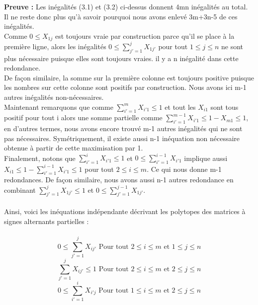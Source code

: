\documentclass{book}
\begin{document}
\textbf{Preuve : }
Les inégalités (3.1) et (3.2) ci-dessus donnent 4mn inégalités au total. \\ Il ne reste donc plus qu'à savoir pourquoi nous avons enlevé 3m+3n-5 de ces inégalités. \\
Comme $0 \leqslant X_{1j}$ est toujours vraie par construction parce qu'il se place à la première ligne, alors les inégalités $0  \leqslant \sum_{j'=1}^{j} X_{1j'}$ pour tout $1 \leqslant j \leqslant n$ ne sont plus nécessaire puisque elles sont toujours vraies. il y a n inégalité dans cette redondance.\\
De façon similaire, la somme sur la première colonne est toujours positive puisque les nombres sur cette colonne sont positifs par construction. Nous avons ici m-1 autres inégalités non-nécessaires. \\
Maintenant remarquons que comme $\sum_{i'=1}^{m} X_{i'1} \leqslant 1 $ et tout les $X_{i1}$ sont tous positif pour tout i alors une somme partielle comme $\sum_{i'=1}^{m-1} X_{i'1} \leqslant 1- X_{m1} \leqslant 1$, en d'autres termes, nous avons encore trouvé m-1 autres inégalités qui ne sont pas nécessaires. Symétriquement, il existe aussi n-1 inéquation non nécessaire obtenue à partir de cette maximisation par 1.\\
Finalement, notons que $\sum_{i'=1}^{i} X_{i'1} \leqslant 1 $ et $ 0 \leqslant \sum_{i'=1}^{i-1} X_{i'1} $ implique aussi $X_{i1} \leqslant 1 - \sum_{i'=1}^{i-1} X_{i'1} \leqslant 1 $ pour tout $ 2 \leqslant i \leqslant m$. Ce qui nous donne m-1 redondances. De façon similaire, nous avons aussi n-1 autres redondance en combinant $\sum_{j'=1}^{j} X_{1j'} \leqslant 1 $ et $ 0 \leqslant \sum_{j'=1}^{j-1} X_{1j'} $.\\\\
Ainsi, voici les inéquations indépendante décrivant les polytopes des matrices à signes alternants partielles : \\\\
\begin{equation}
0 \leqslant \sum_{j'=1}^{j} X_{ij'} \text{ Pour tout } 2 \leqslant i \leqslant m \text{ et } 1 \leqslant j \leqslant n
\end{equation}
\begin{equation}
\sum_{j'=1}^{j} X_{ij'} \leqslant 1 \text{ Pour tout } 2 \leqslant i \leqslant m \text{ et } 2 \leqslant j \leqslant n
\end{equation}
\begin{equation}
0 \leqslant \sum_{i'=1}^{i} X_{i'j} \text{ Pour tout } 1 \leqslant i \leqslant m \text{ et } 2 \leqslant j \leqslant n
\end{equation}
\end{document}
